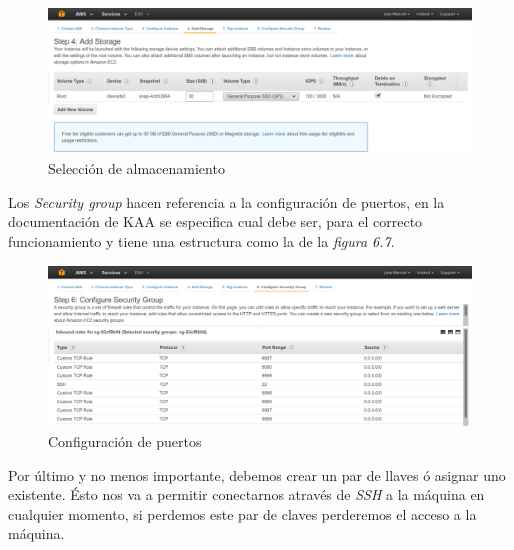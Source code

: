 \begin{figure}[!ht]
  \begin{center}
    \includegraphics[scale=0.30]{../images/kaa/5.png}
		\caption{Selección de almacenamiento}
    \label{fig:kaa}
	\end{center}
\end{figure}

Los \textit{Security group} hacen referencia a la configuración de puertos, en la documentación de KAA se especifica cual debe ser, para el correcto funcionamiento y tiene una estructura como la de la \textit{ figura 6.7}.

\begin{figure}[!ht]
  \begin{center}
    \includegraphics[scale=0.30]{../images/kaa/6.png}
		\caption{Configuración de puertos}
    \label{fig:kaa}
	\end{center}
\end{figure}

\newpage

Por último y no menos importante, debemos crear un par de llaves ó asignar uno existente. Ésto nos va a permitir conectarnos através de \textit{SSH} a la máquina en cualquier momento, si perdemos este par de claves perderemos el acceso a la máquina.

